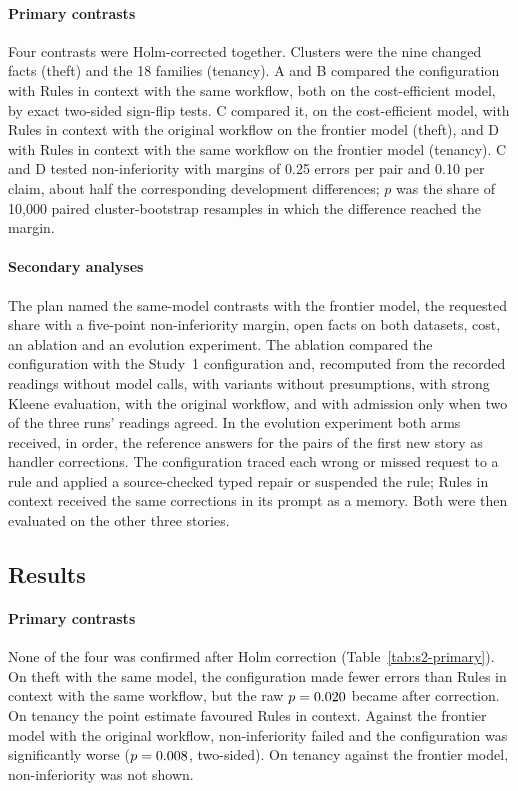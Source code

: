 \paragraph{Primary contrasts}
Four contrasts were Holm-corrected together. Clusters were the nine changed facts (theft) and the 18 families (tenancy). A and B compared the configuration with Rules in context with the same workflow, both on the cost-efficient model, by exact two-sided sign-flip tests. C compared it, on the cost-efficient model, with Rules in context with the original workflow on the frontier model (theft), and D with Rules in context with the same workflow on the frontier model (tenancy). C and D tested non-inferiority with margins of 0.25 errors per pair and 0.10 per claim, about half the corresponding development differences; $p$ was the share of 10,000 paired cluster-bootstrap resamples in which the difference reached the margin.

\paragraph{Secondary analyses}
The plan named the same-model contrasts with the frontier model, the requested share with a five-point non-inferiority margin, open facts on both datasets, cost, an ablation and an evolution experiment. The ablation compared the configuration with the Study~1 configuration and, recomputed from the recorded readings without model calls, with variants without presumptions, with strong Kleene evaluation, with the original workflow, and with admission only when two of the three runs' readings agreed. In the evolution experiment both arms received, in order, the reference answers for the pairs of the first new story as handler corrections. The configuration traced each wrong or missed request to a rule and applied a source-checked typed repair or suspended the rule; Rules in context received the same corrections in its prompt as a memory. Both were then evaluated on the other three stories.

\subsection{Results}
\label{app:s2-results}

\paragraph{Primary contrasts}
None of the four was confirmed after Holm correction (Table~\ref{tab:s2-primary}). On theft with the same model, the configuration made fewer errors than Rules in context with the same workflow, but the raw $p=0.020$ became \stAHolm{} after correction. On tenancy the point estimate favoured Rules in context. Against the frontier model with the original workflow, non-inferiority failed and the configuration was significantly worse ($p=0.008$, two-sided). On tenancy against the frontier model, non-inferiority was not shown.

